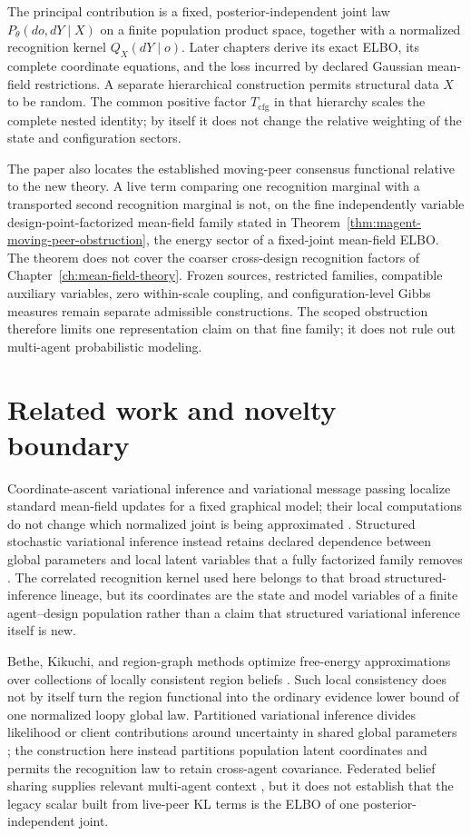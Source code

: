 The principal contribution is a fixed, posterior-independent joint law \(P_\theta(do,dY\mid X)\) on a finite population product space, together with a normalized recognition kernel \(Q_X(dY\mid o)\). Later chapters derive its exact ELBO, its complete coordinate equations, and the loss incurred by declared Gaussian mean-field restrictions. A separate hierarchical construction permits structural data \(X\) to be random. The common positive factor \(T_{\mathrm{cfg}}\) in that hierarchy scales the complete nested identity; by itself it does not change the relative weighting of the state and configuration sectors.

The paper also locates the established moving-peer consensus functional relative to the new theory. A live term comparing one recognition marginal with a transported second recognition marginal is not, on the fine independently variable design-point-factorized mean-field family stated in Theorem~\ref{thm:magent-moving-peer-obstruction}, the energy sector of a fixed-joint mean-field ELBO. The theorem does not cover the coarser cross-design recognition factors of Chapter~\ref{ch:mean-field-theory}. Frozen sources, restricted families, compatible auxiliary variables, zero within-scale coupling, and configuration-level Gibbs measures remain separate admissible constructions. The scoped obstruction therefore limits one representation claim on that fine family; it does not rule out multi-agent probabilistic modeling.

\section{Related work and novelty boundary}

Coordinate-ascent variational inference and variational message passing localize standard mean-field updates for a fixed graphical model; their local computations do not change which normalized joint is being approximated \citep{WinnBishop2005,Blei2017,Wainwright2008}. Structured stochastic variational inference instead retains declared dependence between global parameters and local latent variables that a fully factorized family removes \citep{HoffmanBlei2015}. The correlated recognition kernel used here belongs to that broad structured-inference lineage, but its coordinates are the state and model variables of a finite agent--design population rather than a claim that structured variational inference itself is new.

Bethe, Kikuchi, and region-graph methods optimize free-energy approximations over collections of locally consistent region beliefs \citep{Yedidia2005,Wainwright2008}. Such local consistency does not by itself turn the region functional into the ordinary evidence lower bound of one normalized loopy global law. Partitioned variational inference divides likelihood or client contributions around uncertainty in shared global parameters \citep{Ashman2022PVI}; the construction here instead partitions population latent coordinates and permits the recognition law to retain cross-agent covariance. Federated belief sharing supplies relevant multi-agent context \citep{friston2024federated}, but it does not establish that the legacy scalar built from live-peer KL terms is the ELBO of one posterior-independent joint.

